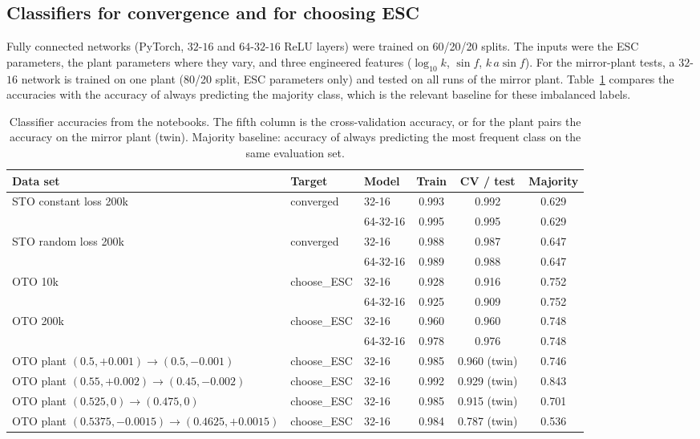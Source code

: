 \documentclass[11pt,a4paper]{article}
\begin{document}
\subsection{Classifiers for convergence and for choosing ESC}
\label{sec:ml}
Fully connected networks (PyTorch, $32$-$16$ and $64$-$32$-$16$ ReLU layers) were trained on 60/20/20 splits. The inputs were the ESC parameters, the plant parameters where they vary, and three engineered features ($\log_{10}k$, $\sin f$, $k\,a\sin f$). For the mirror-plant tests, a $32$-$16$ network is trained on one plant (80/20 split, ESC parameters only) and tested on all runs of the mirror plant. Table~\ref{tab:ml} compares the accuracies with the accuracy of always predicting the majority class, which is the relevant baseline for these imbalanced labels.

\begin{table}[t]
  \centering
  \small
  \caption{Classifier accuracies from the notebooks. The fifth column is the cross-validation accuracy, or for the plant pairs the accuracy on the mirror plant (twin). Majority baseline: accuracy of always predicting the most frequent class on the same evaluation set.}
  \label{tab:ml}
  \begin{tabular}{@{}lllccc@{}}
    \toprule
    Data set & Target & Model & Train & CV / test & Majority \\
    \midrule
    STO constant loss 200k & converged & 32-16 & 0.993 & 0.992 & 0.629 \\
                          &           & 64-32-16 & 0.995 & 0.995 & 0.629 \\
    STO random loss 200k  & converged & 32-16 & 0.988 & 0.987 & 0.647 \\
                          &           & 64-32-16 & 0.989 & 0.988 & 0.647 \\
    OTO 10k               & choose\_ESC & 32-16 & 0.928 & 0.916 & 0.752 \\
                          &             & 64-32-16 & 0.925 & 0.909 & 0.752 \\
    OTO 200k              & choose\_ESC & 32-16 & 0.960 & 0.960 & 0.748 \\
                          &             & 64-32-16 & 0.978 & 0.976 & 0.748 \\
    OTO plant $(0.5,+0.001)\to(0.5,-0.001)$ & choose\_ESC & 32-16 & 0.985 & 0.960 (twin) & 0.746 \\
    OTO plant $(0.55,+0.002)\to(0.45,-0.002)$ & choose\_ESC & 32-16 & 0.992 & 0.929 (twin) & 0.843 \\
    OTO plant $(0.525,0)\to(0.475,0)$ & choose\_ESC & 32-16 & 0.985 & 0.915 (twin) & 0.701 \\
    OTO plant $(0.5375,-0.0015)\to(0.4625,+0.0015)$ & choose\_ESC & 32-16 & 0.984 & 0.787 (twin) & 0.536 \\
    \bottomrule
  \end{tabular}
\end{table}
\end{document}
